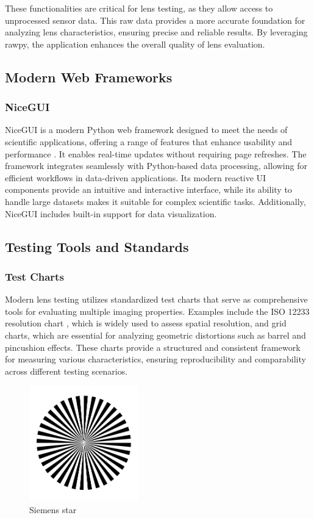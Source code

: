 These functionalities are critical for lens testing, as they allow access to unprocessed sensor data. This raw data provides a more accurate foundation for analyzing lens characteristics, ensuring precise and reliable results. By leveraging rawpy, the application enhances the overall quality of lens evaluation.

\subsection{Modern Web Frameworks}
\subsubsection{NiceGUI}
NiceGUI is a modern Python web framework designed to meet the needs of scientific applications, offering a range of features that enhance usability and performance \cite{nicegui}. It enables real-time updates without requiring page refreshes. The framework integrates seamlessly with Python-based data processing, allowing for efficient workflows in data-driven applications. Its modern reactive UI components provide an intuitive and interactive interface, while its ability to handle large datasets makes it suitable for complex scientific tasks. Additionally, NiceGUI includes built-in support for data visualization.

\subsection{Testing Tools and Standards}

\subsubsection{Test Charts}  
Modern lens testing utilizes standardized test charts that serve as comprehensive tools for evaluating multiple imaging properties. Examples include the ISO 12233 resolution chart \cite{ISO12233}, which is widely used to assess spatial resolution, and grid charts, which are essential for analyzing geometric distortions such as barrel and pincushion effects. These charts provide a structured and consistent framework for measuring various characteristics, ensuring reproducibility and comparability across different testing scenarios.

\begin{figure}[htbp]
\centering
\includegraphics[height=5cm]{Images/siemens_star.png}
\caption{Siemens star \cite{siemens_star}}
\label{fig:siemens_star}
\end{figure}

